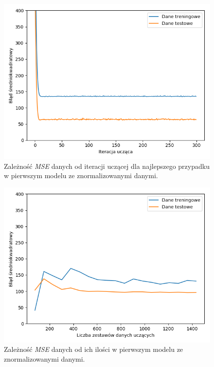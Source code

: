 \documentclass[12pt]{aghdpl}
\newenvironment{tightcenter}{
  \setlength\topsep{0pt}
  \setlength\parskip{0pt}
  \begin{center}
}{
  \end{center}
}
\begin{document}
		\begin{figure}[h]
			\begin{tightcenter}
	 			\includegraphics[width = 0.75\linewidth]{rysunki/pierwszy_model_wykres_uczenia_z_normalizacja.png}
	 		\end{tightcenter}
	 		
 			\caption{Zależność \textit{MSE} danych od iteracji uczącej dla najlepszego przypadku w pierwszym modelu ze znormalizowanymi danymi.}
			\label{fig: pierwszy_model_wykres_uczenia_z_normalizacja}
		\end{figure}
		
		\begin{figure}[h]
			\begin{tightcenter}
	 			\includegraphics[width = 0.75\linewidth]{rysunki/pierwszy_model_learning_curves_z_normalizacja.png}
	 		\end{tightcenter}
	 		
 			\caption{Zależność \textit{MSE} danych od ich ilości w pierwszym modelu ze znormalizowanymi danymi.}
			\label{fig: pierwszy_model_learning_curves_z_normalizacja}
		\end{figure}
		
\end{document}
